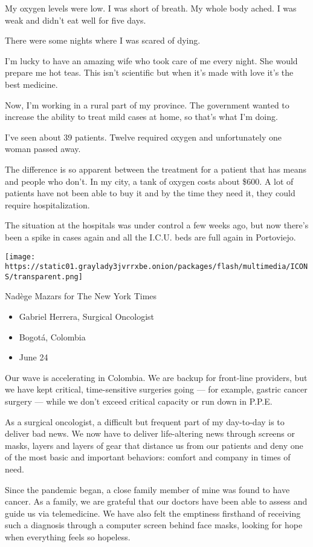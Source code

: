 My oxygen levels were low. I was short of breath. My whole body ached. I
was weak and didn't eat well for five days.

There were some nights where I was scared of dying.

I'm lucky to have an amazing wife who took care of me every night. She
would prepare me hot teas. This isn't scientific but when it's made with
love it's the best medicine.

Now, I'm working in a rural part of my province. The government wanted
to increase the ability to treat mild cases at home, so that's what I'm
doing.

I've seen about 39 patients. Twelve required oxygen and unfortunately
one woman passed away.

The difference is so apparent between the treatment for a patient that
has means and people who don't. In my city, a tank of oxygen costs about
\$600. A lot of patients have not been able to buy it and by the time
they need it, they could require hospitalization.

The situation at the hospitals was under control a few weeks ago, but
now there's been a spike in cases again and all the I.C.U. beds are full
again in Portoviejo.

\texttt{[image: https://static01.graylady3jvrrxbe.onion/packages/flash/multimedia/ICONS/transparent.png]}

Nadège Mazars for The New York Times

\begin{itemize}
\tightlist
\item
  Gabriel Herrera, Surgical Oncologist
\item
  Bogotá, Colombia
\item
  June 24
\end{itemize}

Our wave is accelerating in Colombia. We are backup for front-line
providers, but we have kept critical, time-sensitive surgeries going ---
for example, gastric cancer surgery --- while we don't exceed critical
capacity or run down in P.P.E.

As a surgical oncologist, a difficult but frequent part of my day-to-day
is to deliver bad news. We now have to deliver life-altering news
through screens or masks, layers and layers of gear that distance us
from our patients and deny one of the most basic and important
behaviors: comfort and company in times of need.

Since the pandemic began, a close family member of mine was found to
have cancer. As a family, we are grateful that our doctors have been
able to assess and guide us via telemedicine. We have also felt the
emptiness firsthand of receiving such a diagnosis through a computer
screen behind face masks, looking for hope when everything feels so
hopeless.

